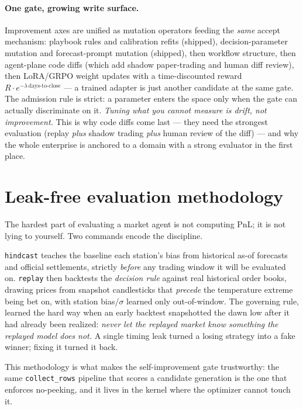 \documentclass[10pt,twocolumn]{article}
\begin{document}
\paragraph{One gate, growing write surface.} Improvement axes are unified as
mutation operators feeding the \emph{same} accept mechanism: playbook rules and
calibration refits (shipped), decision-parameter mutation and forecast-prompt
mutation (shipped), then workflow structure, then agent-plane code diffs (which
add shadow paper-trading and human diff review), then LoRA/GRPO weight updates
with a time-discounted reward $R\cdot e^{-\lambda\,\text{days-to-close}}$ --- a
trained adapter is just another candidate at the same gate. The admission rule is
strict: a parameter enters the space only when the gate can actually discriminate
on it. \emph{Tuning what you cannot measure is drift, not improvement.} This is
why code diffs come last --- they need the strongest evaluation (replay \emph{plus}
shadow trading \emph{plus} human review of the diff) --- and why the whole
enterprise is anchored to a domain with a strong evaluator in the first place.

\section{Leak-free evaluation methodology}
\label{sec:eval}

The hardest part of evaluating a market agent is not computing PnL; it is not
lying to yourself. Two commands encode the discipline.

\texttt{hindcast} teaches the baseline each station's bias from historical as-of
forecasts and official settlements, strictly \emph{before} any trading window it
will be evaluated on. \texttt{replay} then backtests the \emph{decision rule}
against real historical order books, drawing prices from snapshot candlesticks
that \emph{precede} the temperature extreme being bet on, with station bias/$\sigma$
learned only out-of-window. The governing rule, learned the hard way when an
early backtest snapshotted the dawn low after it had already been realized:
\emph{never let the replayed market know something the replayed model does not.}
A single timing leak turned a losing strategy into a fake winner; fixing it
turned it back.

This methodology is what makes the self-improvement gate trustworthy: the same
\texttt{collect\_rows} pipeline that scores a candidate generation is the one that
enforces no-peeking, and it lives in the kernel where the optimizer cannot touch
it.
\end{document}
